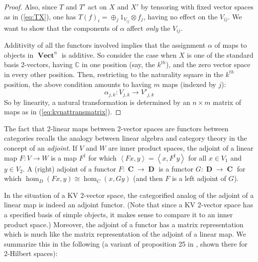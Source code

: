 \documentclass[10pt]{amsart}
\numberwithin{theorem}{subsection}
\newcommand{\ra}{\mathop{\rightarrow}}
\newcommand{\opname}[1]{\operatorname{#1}}
\newcommand{\catname}[1]{\boldsymbol{\opname{{#1}}}}
\newcommand{\inprod}[1]{\left\langle{#1}\right\rangle}
\newcommand{\V}{\catname{Vect}}
\begin{document}
\begin{proof}
Also, since $T$ and $T'$ act on $X$ and $X'$ by tensoring
with fixed vector spaces as in (\ref{eq:TX}), one has $T(f)_i =
\oplus_j 1_{V_{ij}} \otimes f_j$, having no effect on the $V_{ij}$.
We want to show that the components of $\alpha$ affect \textit{only}
the $V_{ij}$.

Additivity of all the functors involved implies that the assignment
$\alpha$ of maps to objects in $\V^n$ is additive.  So consider the
case when $X$ is one of the standard basis 2-vectors, having
$\mathbb{C}$ in one position (say, the $k^{th}$), and the zero vector
space in every other position.  Then, restricting to the naturality
square in the $k^{th}$ position, the above condition amounts to having
$m$ maps (indexed by $j$):
\begin{equation}
\alpha_{j,k} : V_{j,k} \ra V'_{j,k}
\end{equation}
So by linearity, a natural transformation is determined by an $n\times
m$ matrix of maps as in (\ref{eq:kvnattransmatrix}).
\end{proof}

The fact that 2-linear maps between 2-vector spaces are functors
between categories recalls the analogy between linear algebra and
category theory in the concept of an \textit{adjoint}.  If $V$ and $W$
are inner product spaces, the adjoint of a linear map $F : V \ra W$ is
a map $F^{\dagger}$ for which $\inprod{Fx,y} =
\inprod{x,F^{\dagger}y}$ for all $x \in V_1$ and $y \in V_2$.  A
(right) adjoint of a functor $F : \catname{C} \ra \catname{D}$ is a
functor $G : \catname{D} \ra \catname{C}$ for which $\hom_D(Fx,y)
\cong \hom_C(x,Gy)$ (and then $F$ is a left adjoint of $G$).

In the situation of a KV 2-vector space, the categorified analog of
the adjoint of a linear map is indeed an adjoint functor.  (Note that
since a KV 2-vector space has a specified basis of simple objects, it
makes sense to compare it to an inner product space.)  Moreover, the
adjoint of a functor has a matrix representation which is much like
the matrix representation of the adjoint of a linear map.  We
summarize this in the following (a variant of proposition 25 in \cite{hdaII}, shown there for 2-Hilbert spaces):
\end{document}

